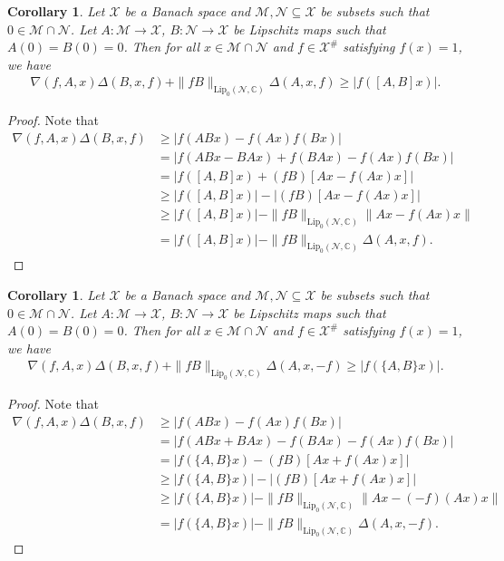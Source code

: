 \documentclass{amsart}
\newtheorem{corollary}[theorem] {Corollary}
\begin{document}
\begin{corollary}
	Let  $\mathcal{X}$ be a Banach space and  $\mathcal{M}, \mathcal{N}\subseteq  \mathcal{X}$ be  subsets such that $0 \in \mathcal{M}\cap \mathcal{N}$. Let $A:\mathcal{M}\to  \mathcal{X}$, $B:\mathcal{N}\to  \mathcal{X}$ be  Lipschitz maps such that $A(0)=B(0)=0$.  Then  for all $x\in \mathcal{M}\cap \mathcal{N}$ and $f \in  \mathcal{X}^\# $ satisfying $f(x)=1$, we have 	
	\begin{align*}
		\nabla(f, A,x)\Delta (B, x, f)+\|fB\|_{\text{Lip}_0(\mathcal{N}, \mathbb{C})}\Delta (A, x, f)\geq |f([A,B]x)|.
	\end{align*}
\end{corollary}
\begin{proof}
	Note that 
	\begin{align*}
\nabla(f, A,x)\Delta (B, x, f)&\geq	|f(ABx)-f(Ax)f(Bx)|\\
&=|f(ABx-BAx)+f(BAx)-f(Ax)f(Bx)|\\
	&=|f([A,B]x)+(fB)[Ax-f(Ax)x]|\\
	&\geq |f([A,B]x)|-|(fB)[Ax-f(Ax)x]|\\
	&\geq |f([A,B]x)|-\|fB\|_{\text{Lip}_0(\mathcal{N}, \mathbb{C})}\|Ax-f(Ax)x\|\\
	&=|f([A,B]x)|-\|fB\|_{\text{Lip}_0(\mathcal{N}, \mathbb{C})}\Delta (A, x, f).
	\end{align*}
\end{proof}
\begin{corollary}
	Let  $\mathcal{X}$ be a Banach space and  $\mathcal{M}, \mathcal{N}\subseteq  \mathcal{X}$ be  subsets such that $0 \in \mathcal{M}\cap \mathcal{N}$. Let $A:\mathcal{M}\to  \mathcal{X}$, $B:\mathcal{N}\to  \mathcal{X}$ be  Lipschitz maps such that $A(0)=B(0)=0$.  Then  for all $x\in \mathcal{M}\cap \mathcal{N}$ and $f \in  \mathcal{X}^\# $ satisfying $f(x)=1$, we have 	
	\begin{align*}
			\nabla(f, A,x)\Delta (B, x, f)+\|fB\|_{\text{Lip}_0(\mathcal{N}, \mathbb{C})}\Delta (A, x, -f)\geq |f(\{A,B\}x)|.
	\end{align*}
\end{corollary}
\begin{proof}
	Note that 
\begin{align*}
	\nabla(f, A,x)\Delta (B, x, f)&\geq	|f(ABx)-f(Ax)f(Bx)|\\
	&=|f(ABx+BAx)-f(BAx)-f(Ax)f(Bx)|\\
	&=|f(\{A,B\}x)-(fB)[Ax+f(Ax)x]|\\
	&\geq |f(\{A,B\}x)|-|(fB)[Ax+f(Ax)x]|\\
	&\geq |f(\{A,B\}x)|-\|fB\|_{\text{Lip}_0(\mathcal{N}, \mathbb{C})}\|Ax-(-f)(Ax)x\|\\
	&=|f(\{A,B\}x)|-\|fB\|_{\text{Lip}_0(\mathcal{N}, \mathbb{C})}\Delta (A, x, -f).
\end{align*}	
\end{proof}
\end{document}
